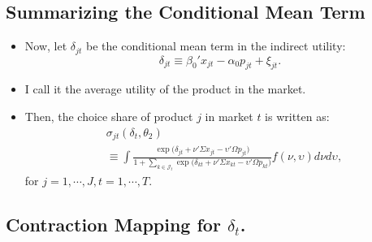 \documentclass[
]{book}
\providecommand{\tightlist}{%
  \setlength{\itemsep}{0pt}\setlength{\parskip}{0pt}}
\begin{document}
\hypertarget{summarizing-the-conditional-mean-term}{%
\subsection{Summarizing the Conditional Mean Term}\label{summarizing-the-conditional-mean-term}}

\begin{itemize}
\tightlist
\item
  Now, let \(\delta_{jt}\) be the conditional mean term in the indirect utility:
  \begin{equation}
  \delta_{jt} \equiv \beta_0' x_{jt} - \alpha_0 p_{jt} + \xi_{jt}.
  \end{equation}
\item
  I call it the average utility of the product in the market.
\item
  Then, the choice share of product \(j\) in market \(t\) is written as:
  \begin{equation}
  \begin{split}
  &\sigma_{jt}(\delta_t, \theta_2) \\
  &\equiv \int \frac{\exp\Bigg(\delta_{jt} + \nu' \Sigma x_{jt} - \upsilon' \Omega p_{jt}\Bigg)}{1 + \sum_{k \in \mathcal{J}_t} \exp\Bigg(\delta_{kt} + \nu' \Sigma x_{kt} - \upsilon' \Omega p_{kt}\Bigg)} f(\nu, \upsilon) d\nu d\upsilon,
  \end{split}
  \end{equation}
  for \(j = 1, \cdots, J, t = 1, \cdots, T\).
\end{itemize}

\hypertarget{contraction-mapping-for-delta_t.}{%
\subsection{\texorpdfstring{Contraction Mapping for \(\delta_t\).}{Contraction Mapping for \textbackslash delta\_t.}}\label{contraction-mapping-for-delta_t.}}
\end{document}
